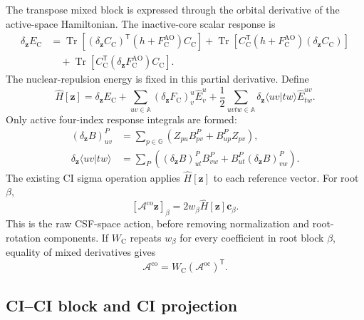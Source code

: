 \documentclass[aip,preprint,nofootinbib]{revtex4-1}
\newcommand{\core}{\mathrm{C}}
\newcommand{\Tr}{\operatorname{Tr}}
\begin{document}
The transpose mixed block is expressed through the orbital derivative of the
active-space Hamiltonian.  The inactive-core scalar response is
\begin{align}
 \delta_{\mathbf z}E_{\core}
 &=\Tr\!\left[(\delta_{\mathbf z}C_{\core})^{\mathsf T}
 (h+F_{\core}^{\mathrm{AO}})C_{\core}\right]
 +\Tr\!\left[C_{\core}^{\mathsf T}
 (h+F_{\core}^{\mathrm{AO}})(\delta_{\mathbf z}C_{\core})\right]
 \nonumber\\
 &\quad+\Tr\!\left[C_{\core}^{\mathsf T}
 (\delta_{\mathbf z}F_{\core}^{\mathrm{AO}})C_{\core}\right].
 \label{eq:nr-core-energy-response}
\end{align}
The nuclear-repulsion energy is fixed in this partial derivative.  Define
\begin{equation}
 \hat H[\mathbf z]
 =\delta_{\mathbf z}E_{\core}
 +\sum_{uv\in\mathbb A}(\delta_{\mathbf z}F_{\core})^u_v\hat E^u_v
 +\frac12\sum_{uvtw\in\mathbb A}
 \delta_{\mathbf z}\langle uv|tw\rangle\hat E^{uv}_{tw}.
 \label{eq:nr-response-hamiltonian}
\end{equation}
Only active four-index response integrals are formed:
\begin{align}
 (\delta_{\mathbf z}B)^P_{uv}
 &=\sum_{p\in\mathbb G}
 \left(Z_{pu}B^P_{pv}+B^P_{up}Z_{pv}\right),
 \\
 \delta_{\mathbf z}\langle uv|tw\rangle
 &=\sum_P\left((\delta_{\mathbf z}B)^P_{ut}B^P_{vw}
               +B^P_{ut}(\delta_{\mathbf z}B)^P_{vw}\right).
 \label{eq:nr-active-df-h-response}
\end{align}
The existing CI sigma operation applies $\hat H[\mathbf z]$ to each reference
vector.  For root $\beta$,
\begin{equation}
 \boxed{
 [\mathcal A^{\mathrm{co}}\mathbf z]_\beta
 =2w_\beta\hat H[\mathbf z]\mathbf c_\beta
 }.
 \label{eq:nr-co-action}
\end{equation}
This is the raw CSF-space action, before removing normalization and
root-rotation components.  If $W_{\mathrm C}$ repeats $w_\beta$ for every
coefficient in root block $\beta$, equality of mixed derivatives gives
\begin{equation}
 \mathcal A^{\mathrm{co}}
 =W_{\mathrm C}(\mathcal A^{\mathrm{oc}})^{\mathsf T}.
 \label{eq:nr-mixed-transpose}
\end{equation}

\subsection{CI--CI block and CI projection}
\end{document}
